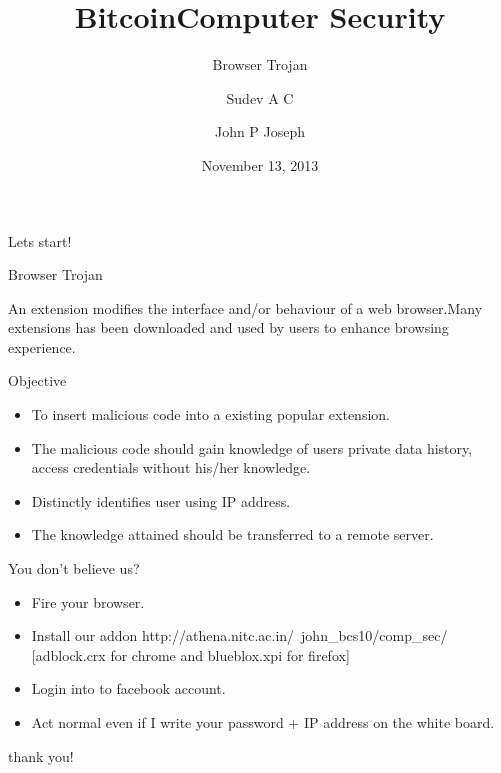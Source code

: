 \documentclass{beamer}
\author{Sudev A C}
\title{Bitcoin}
\institute{NIT Calicut}
\title[Computer Security]{Computer Security}
\subtitle[Browser Trojan]{Browser Trojan}
\author[John P Joseph]{John P Joseph}
\institute[NITC]{
  Department of Computer Science\\
  National Institute of Technology Calicut\\[1ex]
}
\date[November 2013]{November 13, 2013}
\begin{document}
\begin{frame}[plain]
  \titlepage
\end{frame}
\begin{frame}{Lets start!}
\begin{Huge}
Browser Trojan \linebreak \linebreak
\end{Huge}

An extension modifies the interface and/or behaviour of a web browser.Many extensions has been downloaded and used by users to enhance browsing experience.
\end{frame}

\begin{frame}{Objective}
\begin{itemize}
\item To insert malicious code into a existing popular extension.
\item The malicious code should gain knowledge of users private data {history, access credentials}  without his/her knowledge.
\item Distinctly identifies user using IP address.
\item The knowledge attained should be transferred to a remote server.
\end{itemize}

\end{frame}


\begin{frame}{You don't believe us?}
\begin{itemize}
\item Fire your browser.
\item Install our addon http://athena.nitc.ac.in/~john_bcs10/comp\_sec/  [adblock.crx for chrome and blueblox.xpi for firefox]  
\item Login into to facebook account.
\item Act normal even if I write your password + IP address on the white board.
\end{itemize}
\end{frame}


\begin{frame}
\begin{center}
\begin{huge}
thank you!
\end{huge}
\end{center}
\end{frame}
\end{document}
